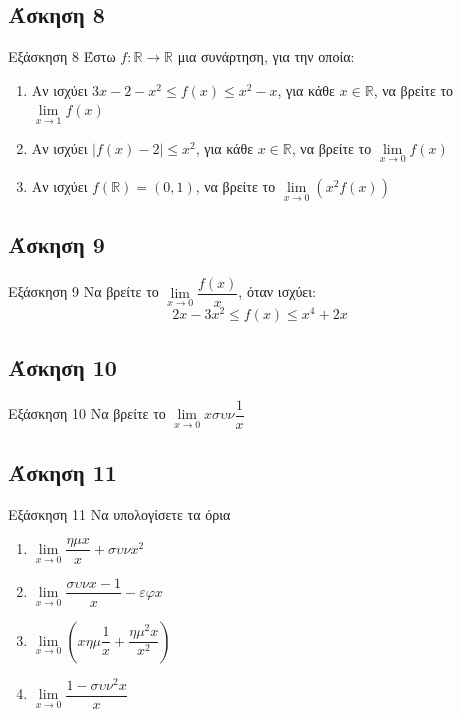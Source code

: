 \documentclass[greek]{beamer}
\begin{document}
\subsection{Άσκηση 8}
\begin{frame}[label=Άσκηση8,t]{Εξάσκηση 8}
  Έστω $f:\mathbb{R}\to\mathbb{R}$ μια συνάρτηση, για την οποία:
  \begin{enumerate}
    \item Αν ισχύει $3x-2-x^2\le f(x) \le x^2-x$, για κάθε $x\in\mathbb{R}$, να βρείτε το $\lim\limits_{x \to 1}{ f(x) }$ \pause
    \item Αν ισχύει $|f(x)-2|\le x^2$, για κάθε $x\in\mathbb{R}$, να βρείτε το $\lim\limits_{x \to 0}{ f(x) }$ \pause
    \item Αν ισχύει $f(\mathbb{R})=(0,1)$, να βρείτε το $\lim\limits_{x \to 0}{ \left(x^2f(x)  \right) }$
  \end{enumerate}

\end{frame}

\subsection{Άσκηση 9}
\begin{frame}[label=Άσκηση9,t]{Εξάσκηση 9}
  Να βρείτε το $\lim\limits_{x \to 0}{ \dfrac{f(x)}{x} }$, όταν ισχύει:
  $$2x-3x^2\le f(x) \le x^4+2x$$

\end{frame}

\subsection{Άσκηση 10}
\begin{frame}[label=Άσκηση10,t]{Εξάσκηση 10}
  Να βρείτε το $\lim\limits_{x \to 0}{ xσυν\dfrac{1}{x} }$

\end{frame}

\subsection{Άσκηση 11}
\begin{frame}[label=Άσκηση11,t]{Εξάσκηση 11}
  Να υπολογίσετε τα όρια
  \begin{enumerate}
    \item $\lim\limits_{x \to 0}{ \dfrac{ημx}{x}+συνx^2 }$ \pause
    \item $\lim\limits_{x \to 0}{ \dfrac{συνx-1}{x}-εφx }$ \pause
    \item $\lim\limits_{x \to 0}{ \left( xημ\dfrac{1}{x}+\dfrac{ημ^2x}{x^2} \right)}$ \pause
    \item $\lim\limits_{x \to 0}{ \dfrac{1-συν^2x}{x} }$
  \end{enumerate}

\end{frame}
\end{document}
